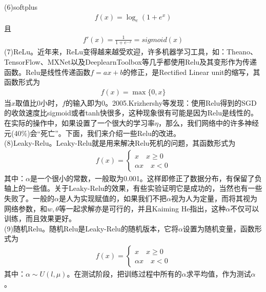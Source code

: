             (6)softplus
            \begin{align*}
            f(x) = \log_e(1+e^x)
            \end{align*}
            且
            \begin{align*}
            f'(x) = \frac{1}{1+e^{-x}} = sigmoid(x)
            \end{align*}
            (7)ReLu。近年来，ReLu变得越来越受欢迎，许多机器学习工具，如：Theano、TensorFlow、MXNet以及DeeplearnToolbox等几乎都使用Relu及其变形作为传递函数。Relu是线性传递函数$f=ax+b$的修正，是Rectified Linear unit的缩写，其函数形式为
            \begin{align*}
            f(x) = \max\{0,x\}
            \end{align*}
            当$x$取值比0小时，$f$的输入即为0。2005.Krizhershy等\cite{2005.Krizhershy}发现：使用Relu得到的SGD的收敛速度比sigmoid或者tanh快很多，这种现象很有可能是因为Relu是线性的。在实际的操作中，如果设置了一个很大的学习率$\eta$，那么，我们网络中的许多神经元(40$\%$)会“死亡”。下面，我们来介绍一些Relu的改进。\\
            (8)Leaky-Relu。Leaky-Relu就是用来解决Relu死机的问题，其函数形式为
            \begin{align*}
            f(x) =
            \left\{
            \begin{aligned}
            x \quad x \geqslant 0\\
            \alpha x \quad x <0
            \end{aligned}
            \right.
            \end{align*}
            其中：$\alpha$是一个很小的常数，一般取为0.001。这样即修正了数据分布，有保留了负轴上的一些值。关于Leaky-Relu的效果，有些实验证明它是成功的，当然也有一些失败了。一般的$\alpha$是人为实现赋值的，如果我们不把$\alpha$视为人为定量，而将其视为网络参数，和$w,\theta$等一起求解亦是可行的，并且Kaiming He\cite{Kaiming}指出，这种$\alpha$不仅可以训练，而且效果更好。\\
            (9)随机Relu。随机Relu是Leaky-Relu的随机版本，它将$\alpha$设置为随机变量，函数形式为
            \begin{align*}
            f(x) =
            \left\{
            \begin{aligned}
            x \quad x \geqslant 0\\
            \alpha x \quad x <0
            \end{aligned}
            \right.
            \end{align*}
            其中：$\alpha \sim U(l,\mu)$。在测试阶段，把训练过程中所有的$\alpha$求平均值，作为测试$\alpha$。\\
